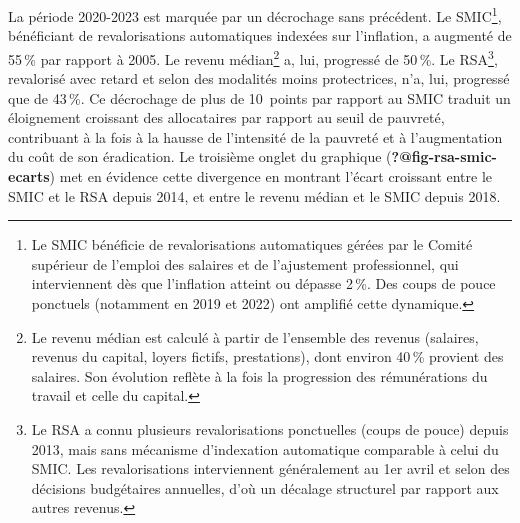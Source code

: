 \documentclass[
  french,
  9pt,
  a4paper,
]{article}
\begin{document}
La période 2020-2023 est marquée par un décrochage sans précédent. Le
SMIC\footnote{Le SMIC bénéficie de revalorisations automatiques gérées
  par le Comité supérieur de l'emploi des salaires et de l'ajustement
  professionnel, qui interviennent dès que l'inflation atteint ou
  dépasse 2\,\%. Des coups de pouce ponctuels (notamment en 2019 et
  2022) ont amplifié cette dynamique.}, bénéficiant de revalorisations
automatiques indexées sur l'inflation, a augmenté de 55\,\% par rapport
à 2005. Le revenu médian\footnote{Le revenu médian est calculé à partir
  de l'ensemble des revenus (salaires, revenus du capital, loyers
  fictifs, prestations), dont environ 40\,\% provient des salaires. Son
  évolution reflète à la fois la progression des rémunérations du
  travail et celle du capital.} a, lui, progressé de 50\,\%. Le
RSA\footnote{Le RSA a connu plusieurs revalorisations ponctuelles (coups
  de pouce) depuis 2013, mais sans mécanisme d'indexation automatique
  comparable à celui du SMIC. Les revalorisations interviennent
  généralement au 1er avril et selon des décisions budgétaires
  annuelles, d'où un décalage structurel par rapport aux autres revenus.},
revalorisé avec retard et selon des modalités moins protectrices, n'a,
lui, progressé que de 43\,\%. Ce décrochage de plus de 10~points par
rapport au SMIC traduit un éloignement croissant des allocataires par
rapport au seuil de pauvreté, contribuant à la fois à la hausse de
l'intensité de la pauvreté et à l'augmentation du coût de son
éradication. Le troisième onglet du graphique
(\textbf{?@fig-rsa-smic-ecarts}) met en évidence cette divergence en
montrant l'écart croissant entre le SMIC et le RSA depuis 2014, et entre
le revenu médian et le SMIC depuis 2018.
\end{document}

